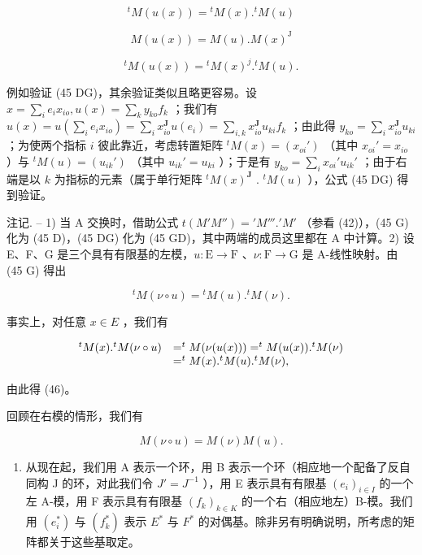 \[
{ } ^ { t } M ( u ( x ) ) = { } ^ { t } M ( x ) . { } ^ { t } M ( u )\tag{45 G}
\]

\[
M (u (x)) = M (u). M (x) ^ {\mathrm{J}}\tag{45 GD}
\]

\[
{ } ^ { t } M ( u ( x ) ) = { } ^ { t } M ( x ) ^ { j } . { } ^ { t } M ( u ) .\tag{45 DG}
\]

例如验证 (45 DG)，其余验证类似且略更容易。设 \(x = \sum_{i} e_i x_{io}, u(x) = \sum_{k} y_{ko} f_k\) ；我们有 \(u(x) = u(\sum_{i} e_i x_{io}) = \sum_{i} x_{io}^{\mathbf{J}} u(e_i) = \sum_{i,k} x_{io}^{\mathbf{J}} u_{ki} f_k\) ；由此得 \(y_{ko} = \sum_{i} x_{io}^{\mathbf{J}} u_{ki}\) ；为使两个指标 \(i\) 彼此靠近，考虑转置矩阵 \(^t M(x) = (x_{oi}')\) （其中 \(x_{oi}' = x_{io}\) ）与 \(^t M(u) = (u_{ik}')\) （其中 \(u_{ik}' = u_{ki}\) ）；于是有 \(y_{ko} = \sum_{i} x_{oi}' u_{ik}'\) ；由于右端是以 \(k\) 为指标的元素（属于单行矩阵 \(^t M(x)^{\mathbf{J}}\) . \(^t M(u)\) ），公式 (45 DG) 得到验证。

注记. -- 1) 当 A 交换时，借助公式 \(t(M'M'') = 'M'''.'M'\) （参看 (42)），(45 G) 化为 (45 D)，(45 DG) 化为 (45 GD)，其中两端的成员这里都在 A 中计算。2) 设 E、F、G 是三个具有有限基的左模，\(u: \mathrm{E} \to \mathrm{F}\) 、\(\nu: \mathrm{F} \to \mathrm{G}\) 是 A-线性映射。由 (45 G) 得出

\[
{ } ^ { t } M ( \nu \circ u ) = { } ^ { t } M ( u ) . { } ^ { t } M ( \nu ) .\tag{46}
\]

事实上，对任意 \(x \in E\) ，我们有

\[
\begin{array}{r l} ^ {t} M (x). ^ {t} M (\nu \circ u) & = ^ {t} M (\nu (u (x))) = ^ {t} M (u (x)). ^ {t} M (\nu) \\ & = ^ {t} M (x). ^ {t} M (u). ^ {t} M (\nu), \end{array}
\]

由此得 (46)。

回顾在右模的情形，我们有

\[
M (\nu \circ u) = M (\nu) M (u).
\]

\begin{enumerate}
\def\labelenumi{\Roman{enumi}.}
\setcounter{enumi}{2}
\tightlist
\item
  从现在起，我们用 A 表示一个环，用 B 表示一个环（相应地一个配备了反自同构 J 的环，对此我们令 \(J' = J^{-1}\) ），用 E 表示具有有限基 \((e_i)_{i \in I}\) 的一个左 A-模，用 F 表示具有有限基 \((f_k)_{k \in K}\) 的一个右（相应地左）B-模。我们用 \((e_i^*)\) 与 \((f_k^*)\) 表示 \(E^*\) 与 \(F^*\) 的对偶基。除非另有明确说明，所考虑的矩阵都关于这些基取定。
\end{enumerate}

